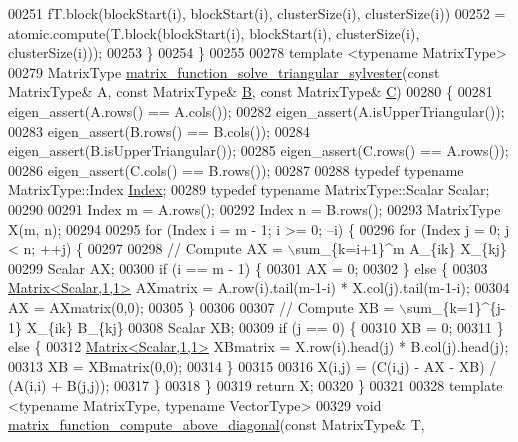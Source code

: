 \begin{DoxyCode}
00251     fT.block(blockStart(i), blockStart(i), clusterSize(i), clusterSize(i))
00252       = atomic.compute(T.block(blockStart(i), blockStart(i), clusterSize(i), clusterSize(i)));
00253   \}
00254 \}
00255 
00278 \textcolor{keyword}{template} <\textcolor{keyword}{typename} MatrixType>
00279 MatrixType \hyperlink{namespace_eigen_1_1internal_a9f7e5b9803071057e7ed4e887da4a1bb}{matrix\_function\_solve\_triangular\_sylvester}(\textcolor{keyword}{const} 
      MatrixType& A, \textcolor{keyword}{const} MatrixType& \hyperlink{group___core___module_class_eigen_1_1_matrix}{B}, \textcolor{keyword}{const} MatrixType& \hyperlink{group___core___module}{C})
00280 \{
00281   eigen\_assert(A.rows() == A.cols());
00282   eigen\_assert(A.isUpperTriangular());
00283   eigen\_assert(B.rows() == B.cols());
00284   eigen\_assert(B.isUpperTriangular());
00285   eigen\_assert(C.rows() == A.rows());
00286   eigen\_assert(C.cols() == B.rows());
00287 
00288   \textcolor{keyword}{typedef} \textcolor{keyword}{typename} MatrixType::Index \hyperlink{namespace_eigen_a62e77e0933482dafde8fe197d9a2cfde}{Index};
00289   \textcolor{keyword}{typedef} \textcolor{keyword}{typename} MatrixType::Scalar Scalar;
00290 
00291   Index m = A.rows();
00292   Index n = B.rows();
00293   MatrixType X(m, n);
00294 
00295   \textcolor{keywordflow}{for} (Index i = m - 1; i >= 0; --i) \{
00296     \textcolor{keywordflow}{for} (Index j = 0; j < n; ++j) \{
00297 
00298       \textcolor{comment}{// Compute AX = \(\backslash\)sum\_\{k=i+1\}^m A\_\{ik\} X\_\{kj\}}
00299       Scalar AX;
00300       \textcolor{keywordflow}{if} (i == m - 1) \{
00301     AX = 0; 
00302       \} \textcolor{keywordflow}{else} \{
00303     \hyperlink{group___core___module_class_eigen_1_1_matrix}{Matrix<Scalar,1,1>} AXmatrix = A.row(i).tail(m-1-i) * X.col(j).tail(m-1-i);
00304     AX = AXmatrix(0,0);
00305       \}
00306 
00307       \textcolor{comment}{// Compute XB = \(\backslash\)sum\_\{k=1\}^\{j-1\} X\_\{ik\} B\_\{kj\}}
00308       Scalar XB;
00309       \textcolor{keywordflow}{if} (j == 0) \{
00310     XB = 0; 
00311       \} \textcolor{keywordflow}{else} \{
00312     \hyperlink{group___core___module_class_eigen_1_1_matrix}{Matrix<Scalar,1,1>} XBmatrix = X.row(i).head(j) * B.col(j).head(j);
00313     XB = XBmatrix(0,0);
00314       \}
00315 
00316       X(i,j) = (C(i,j) - AX - XB) / (A(i,i) + B(j,j));
00317     \}
00318   \}
00319   \textcolor{keywordflow}{return} X;
00320 \}
00321 
00328 \textcolor{keyword}{template} <\textcolor{keyword}{typename} MatrixType, \textcolor{keyword}{typename} VectorType>
00329 \textcolor{keywordtype}{void} \hyperlink{namespace_eigen_1_1internal_a8ff76c47bde59d8af688e5925bed8f17}{matrix\_function\_compute\_above\_diagonal}(\textcolor{keyword}{const} MatrixType& T, \textcolor{keyword}{
}
\end{DoxyCode}

